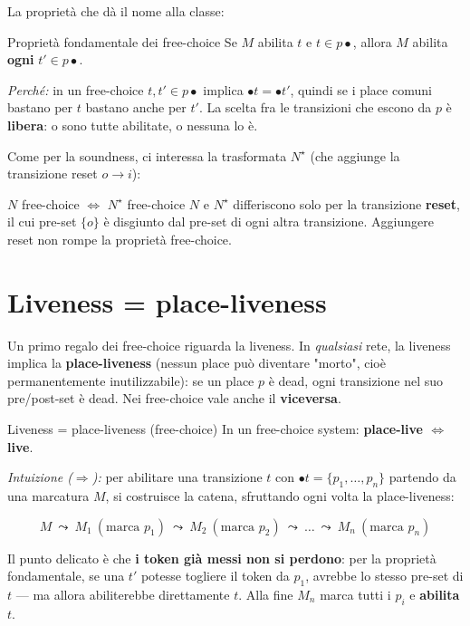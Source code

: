 La proprietà che dà il nome alla classe:

\begin{boxtheorem}{Proprietà fondamentale dei free-choice}
Se $M$ abilita $t$ e $t \in p\bullet$, allora $M$ abilita \textbf{ogni} $t' \in p\bullet$.

\emph{Perché:} in un free-choice $t, t' \in p\bullet$ implica $\bullet t = \bullet t'$, quindi se i place comuni bastano per $t$ bastano anche per $t'$. La scelta fra le transizioni che escono da $p$ è \textbf{libera}: o sono tutte abilitate, o nessuna lo è.
\end{boxtheorem}

Come per la soundness, ci interessa la trasformata $N^\star$ (che aggiunge la transizione reset $o \to i$):

\begin{boxnote}{$N$ free-choice $\iff$ $N^\star$ free-choice}
$N$ e $N^\star$ differiscono solo per la transizione \textbf{reset}, il cui pre-set $\{o\}$ è disgiunto dal pre-set di ogni altra transizione. Aggiungere reset non rompe la proprietà free-choice.
\end{boxnote}

\section{\texorpdfstring{Liveness = place-liveness}{Liveness = place-liveness}}

Un primo regalo dei free-choice riguarda la liveness. In \emph{qualsiasi} rete, la liveness implica la \textbf{place-liveness} (nessun place può diventare "morto", cioè permanentemente inutilizzabile): se un place $p$ è dead, ogni transizione nel suo pre/post-set è dead. Nei free-choice vale anche il \textbf{viceversa}.

\begin{boxtheorem}{Liveness = place-liveness (free-choice)}
In un free-choice system: \textbf{place-live $\iff$ live}.

\emph{Intuizione ($\Rightarrow$):} per abilitare una transizione $t$ con $\bullet t = \{p_1, \dots, p_n\}$ partendo da una marcatura $M$, si costruisce la catena, sfruttando ogni volta la place-liveness:

\[
M \ \leadsto\ M_1 \ (\text{marca } p_1) \ \leadsto\ M_2 \ (\text{marca } p_2) \ \leadsto\ \dots \ \leadsto\ M_n \ (\text{marca } p_n)
\]

Il punto delicato è che \textbf{i token già messi non si perdono}: per la proprietà fondamentale, se una $t'$ potesse togliere il token da $p_1$, avrebbe lo stesso pre-set di $t$ — ma allora abiliterebbe direttamente $t$. Alla fine $M_n$ marca tutti i $p_i$ e \textbf{abilita $t$}.
\end{boxtheorem}

